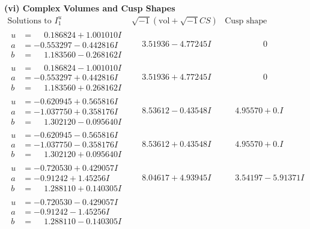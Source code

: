 \documentclass[1p]{elsarticle_modified}
\theoremstyle{definition}
\newcommand{\I}{\sqrt{-1}}
\begin{document}
\newpage\flushleft \textbf{(vi) Complex Volumes and Cusp Shapes}
$$\begin{array}{c|c|c}  
\text{Solutions to }I^u_{1}& \I (\text{vol} + \sqrt{-1}CS) & \text{Cusp shape}\\
 \hline 
\begin{aligned}
u &= \phantom{-}0.186824 + 1.001010 I \\
a &= -0.553297 - 0.442816 I \\
b &= \phantom{-}1.183560 - 0.268162 I\end{aligned}
 & \phantom{-}3.51936 - 4.77245 I & \phantom{-0.000000 } 0 \\ \hline\begin{aligned}
u &= \phantom{-}0.186824 - 1.001010 I \\
a &= -0.553297 + 0.442816 I \\
b &= \phantom{-}1.183560 + 0.268162 I\end{aligned}
 & \phantom{-}3.51936 + 4.77245 I & \phantom{-0.000000 } 0 \\ \hline\begin{aligned}
u &= -0.620945 + 0.565816 I \\
a &= -1.037750 + 0.358176 I \\
b &= \phantom{-}1.302120 - 0.095640 I\end{aligned}
 & \phantom{-}8.53612 - 0.43548 I & \phantom{-}4.95570 + 0. I\phantom{ +0.000000I} \\ \hline\begin{aligned}
u &= -0.620945 - 0.565816 I \\
a &= -1.037750 - 0.358176 I \\
b &= \phantom{-}1.302120 + 0.095640 I\end{aligned}
 & \phantom{-}8.53612 + 0.43548 I & \phantom{-}4.95570 + 0. I\phantom{ +0.000000I} \\ \hline\begin{aligned}
u &= -0.720530 + 0.429057 I \\
a &= -0.91242 + 1.45256 I \\
b &= \phantom{-}1.288110 + 0.140305 I\end{aligned}
 & \phantom{-}8.04617 + 4.93945 I & \phantom{-}3.54197 - 5.91371 I \\ \hline\begin{aligned}
u &= -0.720530 - 0.429057 I \\
a &= -0.91242 - 1.45256 I \\
b &= \phantom{-}1.288110 - 0.140305 I\end{aligned}

\end{array}$$
\end{document}
